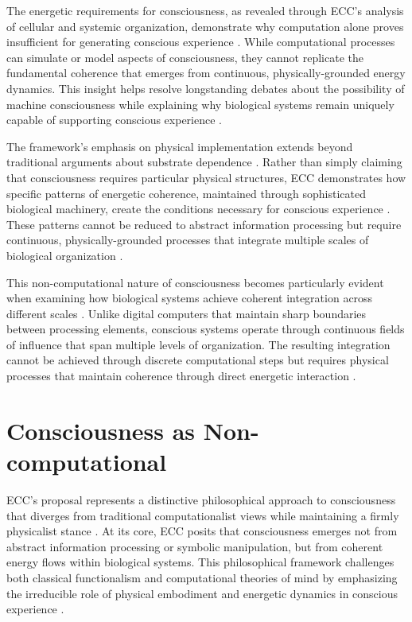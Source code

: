 \begin{refsection}
The energetic requirements for consciousness, as revealed through ECC's analysis of cellular and systemic organization, demonstrate why computation alone proves insufficient for generating conscious experience \cite{varela1997patterns}. While computational processes can simulate or model aspects of consciousness, they cannot replicate the fundamental coherence that emerges from continuous, physically-grounded energy dynamics. This insight helps resolve longstanding debates about the possibility of machine consciousness while explaining why biological systems remain uniquely capable of supporting conscious experience \cite{lyon2015cognitive}.

The framework's emphasis on physical implementation extends beyond traditional arguments about substrate dependence \cite{edwards2005consciousness,polger2016multiple}. Rather than simply claiming that consciousness requires particular physical structures, ECC demonstrates how specific patterns of energetic coherence, maintained through sophisticated biological machinery, create the conditions necessary for conscious experience \cite{shapiro2007bacteria}. These patterns cannot be reduced to abstract information processing but require continuous, physically-grounded processes that integrate multiple scales of biological organization \cite{van2006principles}.

This non-computational nature of consciousness becomes particularly evident when examining how biological systems achieve coherent integration across different scales \cite{margulis2000life}. Unlike digital computers that maintain sharp boundaries between processing elements, conscious systems operate through continuous fields of influence that span multiple levels of organization. The resulting integration cannot be achieved through discrete computational steps but requires physical processes that maintain coherence through direct energetic interaction \cite{godfrey2016other}.

\section{Consciousness as Non-computational}

ECC's proposal represents a distinctive philosophical approach to consciousness that diverges from traditional computationalist views while maintaining a firmly physicalist stance \cite{piccinini2020neurocognitive}. At its core, ECC posits that consciousness emerges not from abstract information processing or symbolic manipulation, but from coherent energy flows within biological systems. This philosophical framework challenges both classical functionalism and computational theories of mind by emphasizing the irreducible role of physical embodiment and energetic dynamics in conscious experience \cite{thompson2001radical}.


\end{refsection}

